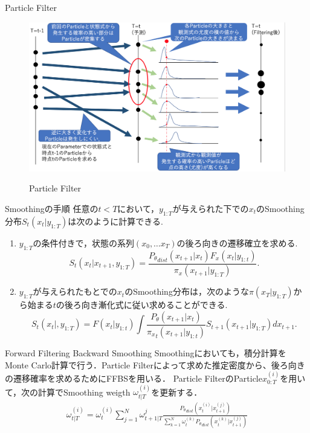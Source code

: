 \documentclass[dvipdfmx]{beamer}
\begin{document}
\begin{frame}{Particle Filter}
\begin{figure}[h]
\begin{center}
  \includegraphics[scale=0.41]{figure/filter_img.png} \\
\label{fig:Em}
\end{center}
\caption{Particle Filter}
\end{figure}
\end{frame}

\begin{frame}{Smoothingの手順}
任意の$t<T$において，$y_{1:T}$が与えられた下での$x_t$のSmoothing分布$S_t(x_t|y_{1:T})$は次のように計算できる.
\begin{enumerate}
 \item $y_{1:T}$の条件付きで，状態の系列$(x_0,\dots x_T)$の後ろ向きの遷移確立を求める.
\begin{equation*}
 S_t(x_t|x_{t+1},y_{1:T})=\frac{{P_\theta}_{dist}(x_{t+1}|x_t){F_x} (x_t|y_{1:t})}{\pi_x(x_{t+1}|y_{1:T})}.
\end{equation*}
 \item $y_{1:T}$が与えられたもとでの$x_t$のSmoothing分布は，次のような$\pi(x_T|y_{1:T})$から始まる$t$の後ろ向き漸化式に従い求めることができる.
\begin{equation*}
S_t(x_t|,y_{1:T})=F(x_t|y_{1:t})\int \frac{P_\theta(x_{t+1}|x_t)}{{\pi_x}_t(x_{t+1}|y_{1:t})}S_{t+1}(x_{t+1}|y_{1:T})dx_{t+1}.
\end{equation*}
\end{enumerate}
\end{frame}

\begin{frame}{Forward Filtering Backward Smoothing}
Smoothingにおいても，積分計算をMonte Carlo計算で行う．Particle Filterによって求めた推定密度から、後ろ向きの遷移確率を求めるためにFFBSを用いる．
Particle FilterのParticle${x}^{(i)}_{0:T}$を用いて，次の計算でSmoothing weigth $\omega_{t|T}^{(i)}$を更新する．
\begin{eqnarray*}
\omega_{t|T}^{(i)}=\omega_{t}^{(i)}\sum_{j=1}^N\omega_{t+1|T}^j\frac{{P_{\theta}}_{dist}(x_t^{(i)}|x_{t+1}^{(j)})}{\sum_{k=1}^{N}\omega_t^{(k)}{P_\theta}_{dist}(x_t^{(k)}|x_{t+1}^{(j)})}
\end{eqnarray*}
\end{frame}
\end{document}
